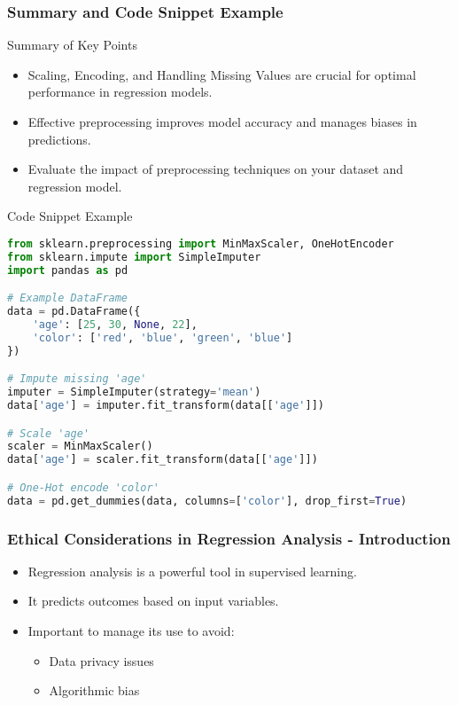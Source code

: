 \documentclass[aspectratio=169]{beamer}
\begin{document}
\begin{frame}[fragile]
    \frametitle{Summary and Code Snippet Example}
    \begin{block}{Summary of Key Points}
        \begin{itemize}
            \item Scaling, Encoding, and Handling Missing Values are crucial for optimal performance in regression models.
            \item Effective preprocessing improves model accuracy and manages biases in predictions.
            \item Evaluate the impact of preprocessing techniques on your dataset and regression model.
        \end{itemize}
    \end{block}

    \begin{block}{Code Snippet Example}
        \begin{lstlisting}[language=Python]
from sklearn.preprocessing import MinMaxScaler, OneHotEncoder
from sklearn.impute import SimpleImputer
import pandas as pd

# Example DataFrame
data = pd.DataFrame({
    'age': [25, 30, None, 22],
    'color': ['red', 'blue', 'green', 'blue']
})

# Impute missing 'age'
imputer = SimpleImputer(strategy='mean')
data['age'] = imputer.fit_transform(data[['age']])

# Scale 'age'
scaler = MinMaxScaler()
data['age'] = scaler.fit_transform(data[['age']])

# One-Hot encode 'color'
data = pd.get_dummies(data, columns=['color'], drop_first=True)
        \end{lstlisting}
    \end{block}
\end{frame}

\begin{frame}[fragile]
    \frametitle{Ethical Considerations in Regression Analysis - Introduction}
    \begin{itemize}
        \item Regression analysis is a powerful tool in supervised learning.
        \item It predicts outcomes based on input variables.
        \item Important to manage its use to avoid:
        \begin{itemize}
            \item Data privacy issues
            \item Algorithmic bias
        \end{itemize}
    \end{itemize}
\end{frame}
\end{document}
